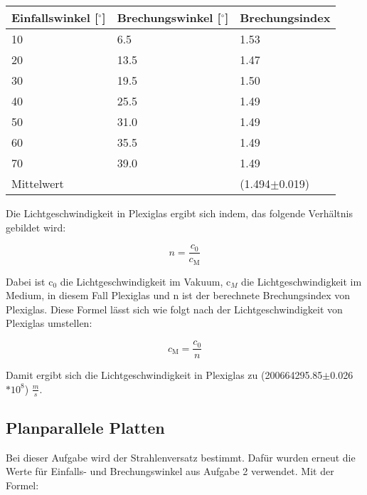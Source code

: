 \begin{minipage}{\linewidth}
    \begin{table}[H]
        \centering
    \begin{tabular}{lll}
        \toprule
        Einfallswinkel [$^\circ$] & Brechungswinkel [$^\circ$] & Brechungsindex \\
        \midrule
        10 &  6.5 & 1.53 \\
        20 & 13.5 & 1.47 \\
        30 & 19.5 & 1.50 \\
        40 & 25.5 & 1.49 \\ 
        50 & 31.0 & 1.49 \\
        60 & 35.5 & 1.49 \\
        70 & 39.0 & 1.49 \\
        \midrule
        Mittelwert & & (1.494$\pm$0.019)\\
        \bottomrule   
    \end{tabular}
    
    \label{tab:2}
\end{table}
\end{minipage}

\noindent Die Lichtgeschwindigkeit in Plexiglas ergibt sich indem, das folgende Verhältnis gebildet wird:

\begin{displaymath}
    n = \frac{c_0}{c_\text{M}}
\end{displaymath}

\noindent Dabei ist c$_0$ die Lichtgeschwindigkeit im Vakuum, c$_M$ die Lichtgeschwindigkeit im Medium, in diesem Fall Plexiglas und n ist der berechnete Brechungsindex von Plexiglas. Diese Formel lässt sich wie folgt nach der Lichtgeschwindigkeit von Plexiglas umstellen:

\begin{displaymath}
    c_\text{M} = \frac{c_0}{n} 
\end{displaymath}

\noindent Damit ergibt sich die Lichtgeschwindigkeit in Plexiglas zu (200664295.85$\pm$0.026$*10^8$) $\frac{m}{s}$.

\subsection{Planparallele Platten}

Bei dieser Aufgabe wird der Strahlenversatz bestimmt. Dafür wurden erneut die Werte für Einfalls- und Brechungswinkel aus Aufgabe 2 verwendet. Mit der Formel:

